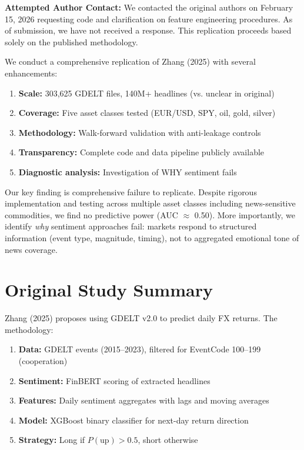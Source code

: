 \documentclass[11pt]{article}
\begin{document}
\textbf{Attempted Author Contact:} We contacted the original authors on February 15, 2026 requesting code and clarification on feature engineering procedures. As of submission, we have not received a response. This replication proceeds based solely on the published methodology.

We conduct a comprehensive replication of Zhang (2025) with several enhancements:
\begin{enumerate}
    \item \textbf{Scale:} 303,625 GDELT files, 140M+ headlines (vs. unclear in original)
    \item \textbf{Coverage:} Five asset classes tested (EUR/USD, SPY, oil, gold, silver)
    \item \textbf{Methodology:} Walk-forward validation with anti-leakage controls
    \item \textbf{Transparency:} Complete code and data pipeline publicly available
    \item \textbf{Diagnostic analysis:} Investigation of WHY sentiment fails
\end{enumerate}

Our key finding is comprehensive failure to replicate. Despite rigorous implementation and testing across multiple asset classes including news-sensitive commodities, we find no predictive power (AUC $\approx$ 0.50). More importantly, we identify \textit{why} sentiment approaches fail: markets respond to structured information (event type, magnitude, timing), not to aggregated emotional tone of news coverage.

\section{Original Study Summary}

Zhang (2025) proposes using GDELT v2.0 \citep{leetaru2013gdelt} to predict daily FX returns. The methodology:

\begin{enumerate}
    \item \textbf{Data:} GDELT events (2015--2023), filtered for EventCode 100--199 (cooperation)
    \item \textbf{Sentiment:} FinBERT \citep{araci2019finbert} scoring of extracted headlines
    \item \textbf{Features:} Daily sentiment aggregates with lags and moving averages
    \item \textbf{Model:} XGBoost binary classifier for next-day return direction
    \item \textbf{Strategy:} Long if $P(\text{up}) > 0.5$, short otherwise
\end{enumerate}
\end{document}
